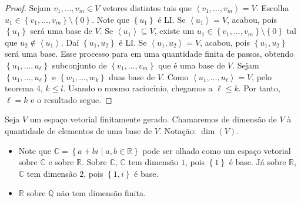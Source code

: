 \begin{proof}
	Sejam $v_{1},\dotsc,v_{m}\in V$ vetores distintos tais que $\left\langle v_{1},\dotsc,v_{m}\right\rangle=V$.
	Escolha $u_{1}\in\left\{v_{1},\dotsc,v_{m}\right\}\setminus\left\{0\right\}$.
	Note que $\left\{u_{1}\right\}$ é LI.
	Se $\left\langle u_{1}\right\rangle=V$, acabou, pois $\left\{u_{1}\right\}$ será uma base de $V$.
	Se $\left\langle u_{1}\right\rangle\subseteq V$, existe um $u_{1}\in\left\{v_{1},\dotsc,v_{m}\right\}\setminus\left\{0\right\}$ tal que $u_{2}\notin\left\langle u_{1}\right\rangle$.
	Daí $\left\{u_{1},u_{2}\right\}$ é LI.
	Se $\left\langle u_{1},u_{2}\right\rangle=V$, acabou, pois
	$\left\{u_{1},u_{2}\right\}$ será uma base.
	Esse processo para em uma quantidade finita de passos, obtendo
	$\left\{u_{1},\dotsc,u_{\ell}\right\}$ subconjunto de
	$\left\{v_{1},\dotsc,v_{m}\right\}$ que é uma base de $V$.
	Sejam $\left\{u_{1},\dotsc,u_{\ell}\right\}$ e $\left\{w_{1},\dotsc,w_{k}\right\}$ duas base de $V$.
	Como $\left\langle u_{1},\dotsc,u_{\ell}\right\rangle=V$, pelo teorema 4, $k\leq l$.
	Usando o mesmo raciocínio, chegamos a $\ell\leq k$.
	Por tanto, $\ell=k$ e o resultado segue.
\end{proof}

\begin{definition}
	Seja $V$ um espaço vetorial finitamente gerado.
	Chamaremos de dimensão de $V$ à quantidade de elementos de uma base de $V$. Notação: $\dim\left(V\right)$.
\end{definition}

\begin{example}
	\begin{itemize}\leavevmode
		\item

		      Note que $\mathbb{C}=\left\{a+bi\mid a,b\in\mathbb{R}\right\}$ pode ser olhado como um espaço vetorial sobre $\mathbb{C}$ e sobre $\mathbb{R}$.
		      Sobre $\mathbb{C}$, $\mathbb{C}$ tem dimensão $1$, pois $\left\{1\right\}$ é base.
		      Já sobre $\mathbb{R}$, $\mathbb{C}$ tem dimensão $2$, pois $\left\{1,i\right\}$ é base.

		\item

		      $\mathbb{R}$ sobre $\mathbb{Q}$ não tem dimensão finita.
	\end{itemize}
\end{example}

